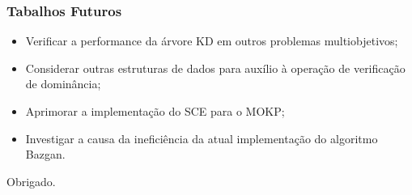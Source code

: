 \documentclass[10pt,xcolor=table,fleqn]{beamer}
\begin{document}
\begin{frame}
	\frametitle{Tabalhos Futuros}
  \begin{itemize}
    \item{ Verificar a performance da árvore KD em outros problemas
      multiobjetivos;}
    \item{ Considerar outras estruturas de dados
      para auxílio à operação de verificação de dominância;}
    \item{ Aprimorar a implementação do SCE para o MOKP;}
    \item{ Investigar a causa da ineficiência da atual implementação
      do algoritmo Bazgan.}
  \end{itemize}
\end{frame}

\begin{frame}
  \vfill
  \begin{center}
    Obrigado.
  \end{center}
  \vfill
\end{frame}

\begin{frame}
\end{frame}
\end{document}
